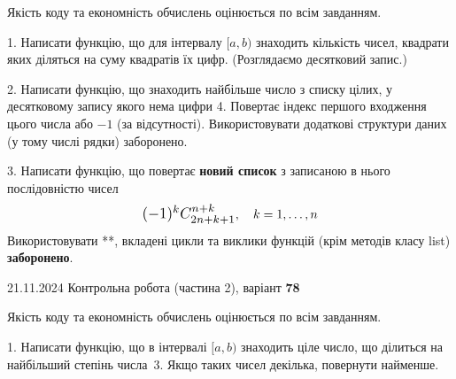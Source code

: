 \documentclass[12pt, ukrainian]{article}
\begin{document}
{{{{{{{{{{{{{{{{{%

{
\begin {large}
Якість коду та економність обчислень оцінюється по всім завданням.

\vspace{5mm}

1. Написати функцію, що для інтервалу $[a, b)$ знаходить кількість чисел, квадрати яких діляться на суму квадратів їх цифр. (Розглядаємо десятковий запис.)

\vspace{10mm}


2. Написати функцію, що знаходить найбільше число з списку цілих, у десятковому запису якого нема цифри 4. Повертає індекс першого входження цього числа або $-1$ (за відсутності). Використовувати додаткові структури даних (у тому числі рядки) заборонено.

\vspace{10mm}


3. 
Написати функцію, що повертає \textbf{новий список} з записаною в нього послідовністю чисел
$$\scalebox{1.2}{$(-1)^{k}C_{2n+k+1}^{n+k}$}, \quad k=1,\ldots,n$$
Використовувати **, вкладені цикли та виклики функцій (крім методів класу list) \textbf{заборонено}.

\end{large}
\newpage
{{21.11.2024 Контрольна робота  (частина 2), варіант  \No \textbf { 78 }\par}}


{
\begin {large}
Якість коду та економність обчислень оцінюється по всім завданням.

\vspace{5mm}

1. Написати функцію, що в інтервалі $[a, b)$ знаходить ціле число, що ділиться на найбільший степінь числа 3. Якщо таких чисел декілька, повернути найменше.


\end{large}}}}}}}}}}}}}}}}}}}}
\end{document}

